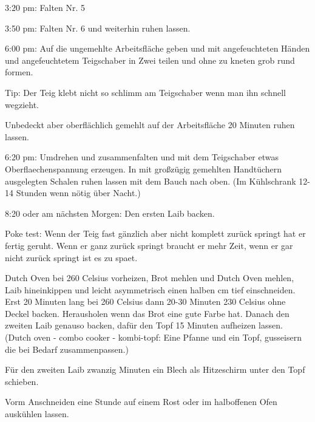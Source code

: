 { 3:20 pm: Falten Nr. 5

 3:50 pm: Falten Nr. 6 und weiterhin ruhen lassen.

 6:00 pm: Auf die ungemehlte Arbeitsfläche geben und mit angefeuchteten Händen und angefeuchtetem Teigschaber in Zwei teilen und ohne zu kneten grob rund formen.

Tip: Der Teig klebt nicht so schlimm am Teigschaber wenn man ihn schnell wegzieht.

Unbedeckt aber oberflächlich gemehlt auf der Arbeitsfläche 20 Minuten ruhen lassen.

 6:20 pm:
Umdrehen und zusammenfalten und mit dem Teigschaber etwas Oberflaechenspannung erzeugen.
In mit großzügig gemehlten Handtüchern ausgelegten Schalen ruhen lassen mit dem Bauch nach oben. (Im Kühlschrank 12-14 Stunden wenn nötig über Nacht.)

 8:20 oder am nächsten Morgen: Den ersten Laib backen.

Poke test: Wenn der Teig fast gänzlich aber nicht komplett zurück springt hat er fertig geruht.
Wenn er ganz zurück springt braucht er mehr Zeit, wenn er gar nicht zurück springt ist es zu spaet.

Dutch Oven bei 260 Celsius vorheizen, Brot mehlen und Dutch Oven mehlen, Laib hineinkippen und leicht asymmetrisch einen halben cm tief einschneiden.
Erst 20 Minuten lang bei 260 Celsius dann 20-30 Minuten 230 Celsius ohne Deckel backen.
Herausholen wenn das Brot eine gute Farbe hat.
Danach den zweiten Laib genauso backen, dafür den Topf 15 Minuten aufheizen lassen.
(Dutch oven - combo cooker - kombi-topf:
Eine Pfanne und ein Topf, gusseisern die bei Bedarf zusammenpassen.)

Für den zweiten Laib zwanzig Minuten ein Blech als Hitzeschirm unter den Topf schieben.

Vorm Anschneiden eine Stunde auf einem Rost oder im halboffenen Ofen auskühlen lassen. }


